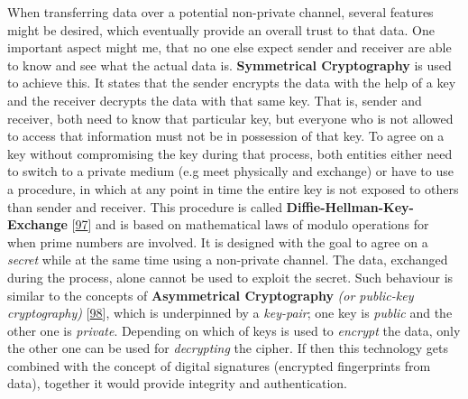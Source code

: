 \documentclass[12pt,english,a4paper,titlepage,cleardoublepage=empty,dottedtoc]{report}
\begin{document}
When transferring data over a potential non-private channel, several
features might be desired, which eventually provide an overall trust to
that data. One important aspect might me, that no one else expect sender
and receiver are able to know and see what the actual data is.
\textbf{Symmetrical Cryptography} is used to achieve this. It states
that the sender encrypts the data with the help of a key and the
receiver decrypts the data with that same key. That is, sender and
receiver, both need to know that particular key, but everyone who is not
allowed to access that information must not be in possession of that
key. To agree on a key without compromising the key during that process,
both entities either need to switch to a private medium (e.g meet
physically and exchange) or have to use a procedure, in which at any
point in time the entire key is not exposed to others than sender and
receiver. This procedure is called \textbf{Diffie-Hellman-Key-Exchange}
{[}\protect\hyperlink{ref-paper_1976_d-h-key-exchange}{97}{]} and is
based on mathematical laws of modulo operations for when prime numbers
are involved. It is designed with the goal to agree on a \emph{secret}
while at the same time using a non-private channel. The data, exchanged
during the process, alone cannot be used to exploit the secret. Such
behaviour is similar to the concepts of
\textbf{\protect\hypertarget{link_asym-crypto}{}{Asymmetrical
Cryptography}} \emph{(or public-key cryptography)}
{[}\protect\hyperlink{ref-book_2014_chapter-9-1-public-key-crypto}{98}{]},
which is underpinned by a \emph{key-pair}; one key is \emph{public} and
the other one is \emph{private}. Depending on which of keys is used to
\emph{encrypt} the data, only the other one can be used for
\emph{decrypting} the cipher. If then this technology gets combined with
the concept of digital signatures (encrypted fingerprints from data),
together it would provide integrity and authentication.
\end{document}

